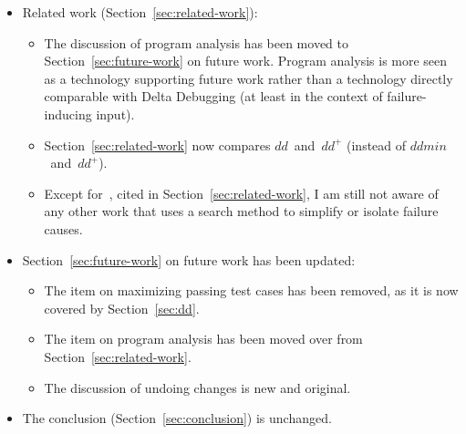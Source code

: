 \documentclass{acm_proc_article-sp}
\newcommand{\edd}{\textit{dd}^+\xspace}
\newcommand{\dd}{\textit{dd}\xspace}
\newcommand{\ddmin}{\textit{ddmin}\xspace}
\theoremstyle{plain}
\begin{document}
\begin{itemize}
\item Related work (Section~\ref{sec:related-work}):

  \begin{itemize}
  \item The discussion of program analysis has been moved to
    Section~\ref{sec:future-work} on future work.  Program analysis is
    more seen as a technology supporting future work rather than a
    technology directly comparable with Delta Debugging (at least in
    the context of failure-inducing input).
  
  \item Section~\ref{sec:related-work} now compares $\dd$~and~$\edd$
    (instead of $\ddmin$~and~$\edd$).
  
  \item Except for~\cite{whalley/94/toplas}, cited in
    Section~\ref{sec:related-work}, I am still not aware of any other
    work that uses a search method to simplify or isolate failure
    causes.
  \end{itemize}
  
\item Section~\ref{sec:future-work} on future work has been updated:
  \begin{itemize}
  \item The item on maximizing passing test cases has been removed, as it is
    now covered by Section~\ref{sec:dd}.
    
  \item The item on program analysis has been moved over from
    Section~\ref{sec:related-work}.

  \item The discussion of undoing changes is new and original.
  \end{itemize}

\item The conclusion (Section~\ref{sec:conclusion}) is unchanged.

\end{itemize}
\end{document}
